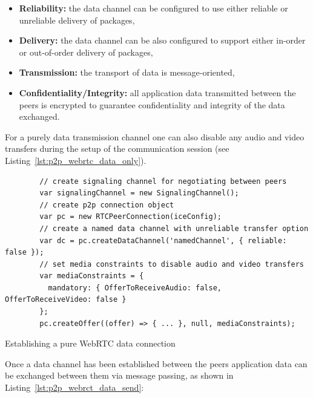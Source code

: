 \begin{itemize}
		\item \textbf{Reliability:} the data channel can be configured to use either reliable or unreliable delivery of packages,
		\item \textbf{Delivery:} the data channel can be also configured to support either in-order or out-of-order delivery of packages,
		\item \textbf{Transmission:} the transport of data is message-oriented,
		\item \textbf{Confidentiality/Integrity:} all application data transmitted between the peers is encrypted to guarantee confidentiality and integrity of the data exchanged.
\end{itemize}

For a purely data transmission channel one can also disable any audio and video transfers during the setup of the communication session (see Listing~\ref{lst:p2p_webrtc_data_only}). \@

\begin{listing}[H]
	\begin{verbatim}
		// create signaling channel for negotiating between peers
		var signalingChannel = new SignalingChannel();
		// create p2p connection object
		var pc = new RTCPeerConnection(iceConfig);
		// create a named data channel with unreliable transfer option
		var dc = pc.createDataChannel('namedChannel', { reliable: false });
		// set media constraints to disable audio and video transfers
		var mediaConstraints = {
		  mandatory: { OfferToReceiveAudio: false, OfferToReceiveVideo: false }
		};
		pc.createOffer((offer) => { ... }, null, mediaConstraints);
	\end{verbatim}
\caption[Establishing a pure \gls{WebRTC} data connection]{Establishing a pure \gls{WebRTC} data connection \citep[pg. 349]{grigorik2013high}}
\label{lst:p2p_webrtc_data_only}
\end{listing}

Once a data channel has been established between the peers application data can be exchanged between them via message passing, as shown in Listing~\ref{lst:p2p_webrct_data_send}: \@

